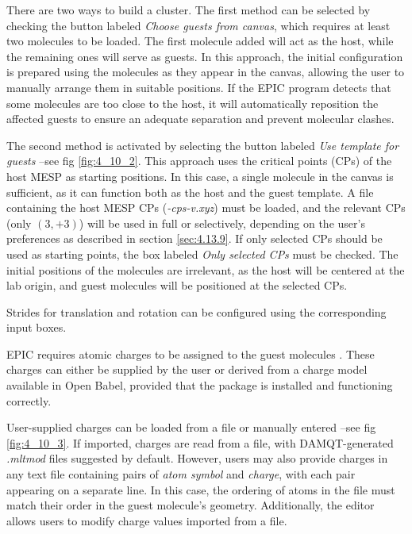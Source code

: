 \documentclass[10pt]{article}
\begin{document}
\vspace*{5mm}

There are two ways to build a cluster. The first method can be selected by  
checking the button labeled {\it Choose guests from canvas}, which requires at  
least two molecules to be loaded. The first molecule added will act as the host,  
while the remaining ones will serve as guests. In this approach, the initial  
configuration is prepared using the molecules as they appear in the canvas,  
allowing the user to manually arrange them in suitable positions. If the EPIC  
program detects that some molecules are too close to the host, it will  
automatically reposition the affected guests to ensure an adequate separation  
and prevent molecular clashes.  

The second method is activated by selecting the button labeled  
{\it Use template for guests} --see fig \ref{fig:4_10_2}. This approach  
uses the critical points (CPs) of the host MESP as starting positions. In this  
case, a single molecule in the canvas is sufficient, as it can function both as  
the host and the guest template. A file containing the host MESP CPs  
({\it *-cps-v.xyz}) must be loaded, and the relevant CPs (only $(3,+3)$)  
will be used in full or selectively, depending on the user's preferences as  
described in section \ref{sec:4.13.9}. If only selected CPs should be used as  
starting points, the box labeled {\it Only selected CPs} must be checked. The  
initial positions of the molecules are irrelevant, as the host will be centered  
at the lab origin, and guest molecules will be positioned at the selected CPs.  

Strides for translation and rotation can be configured using the corresponding  
input boxes.  

EPIC requires atomic charges to be assigned to the guest molecules  
. These charges can either be supplied  
by the user or derived from a charge model available in Open Babel, provided that  
the package is installed and functioning correctly.  

User-supplied charges can be loaded from a file or manually 
entered --see fig \ref{fig:4_10_3}. If imported, charges are read from a file,  
with DAMQT-generated {\it .mltmod} files suggested by default. However, users  
may also provide charges in any text file containing pairs of {\it atom symbol}  
and {\it charge}, with each pair appearing on a separate line. In this case, the  
ordering of atoms in the file must match their order in the guest molecule's  
geometry. Additionally, the editor allows users to modify charge values imported  
from a file.  
\end{document}
